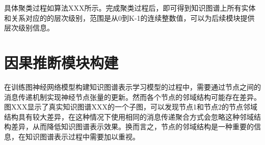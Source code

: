 \documentclass[algorithmlist, AutoFakeBold, AutoFakeSlant, figurelist, tablelist, nomlist, masters]{seuthesix}
\begin{document}

具体聚类过程如算法XXX所示。完成聚类过程后，即可得到知识图谱上所有实体和关系对应的的层次级别，范围是从0到K-1的连续整数值，可以为后续模块提供层次级别信息。

\section{因果推断模块构建}
在训练图神经网络模型构建知识图谱表示学习模型的过程中，需要通过节点之间的消息传递机制实现神经节点张量的更新。然而各个节点的邻域结构可能存在差异。图XXX显示了真实知识图谱XXX的一个子图，可以发现节点1和节点2的节点邻域结构具有较大差异，在这种情况下使用相同的消息传递聚合方式会忽略这种邻域结构差异，从而降低知识图谱表示效果。换而言之，节点的邻域结构是一种重要的信息，在知识图谱表示过程中需要加以重视。
\end{document}
